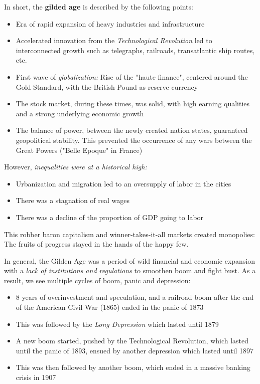 \documentclass[a4paper]{extarticle}
\begin{document}
In short, the \textbf{gilded age} is described by the following points:

\begin{itemize}
    \item Era of rapid expansion of heavy industries and infrastructure
    \item Accelerated innovation from the \textit{Technological Revolution} led to interconnected growth such as telegraphs, railroads, transatlantic ship routes, etc.
    \item First wave of \textit{globalization:} Rise of the "haute finance", centered around the Gold Standard, with the British Pound as reserve currency
    \item The stock market, during these times, was solid, with high earning qualities and a strong underlying economic growth
    \item The balance of power, between the newly created nation states, guaranteed geopolitical stability. This prevented the occurrence of any wars between the Great Powers ("Belle Epoque" in France)
\end{itemize}

However, \textit{inequalities were at a historical high:}

\begin{itemize}
    \item Urbanization and migration led to an oversupply of labor in the cities
    \item There was a stagnation of real wages
    \item There was a decline of the proportion of GDP going to labor
\end{itemize}

This robber baron capitalism and winner-takes-it-all markets created monopolies: The fruits of progress stayed in the hands of the happy few.

In general, the Gilden Age was a period of wild financial and economic expansion with a \textit{lack of institutions and regulations} to smoothen boom and fight bust. As a result, we see multiple cycles of boom, panic and depression:

\begin{itemize}
    \item 8 years of overinvestment and speculation, and a railroad boom after the end of the American Civil War (1865) ended in the panic of 1873
    \item This was followed by the \textit{Long Depression} which lasted until 1879
    \item A new boom started, pushed by the Technological Revolution, which lasted until the panic of 1893, ensued by another depression which lasted until 1897
    \item This was then followed by another boom, which ended in a massive banking crisis in 1907
\end{itemize}
\end{document}
